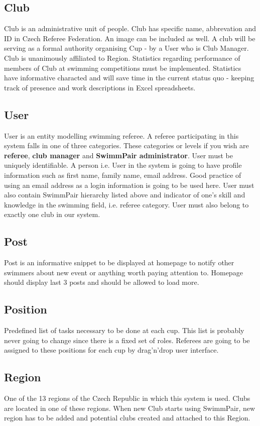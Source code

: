 \subsection*{Club}
\par
Club is an administrative unit of people. Club has specific name, abbrevation and ID in Czech Referee Federation. An image can be included as well. A club will be serving as a formal authority organising Cup - by a User who is Club Manager. Club is unanimously affiliated to Region. Statistics regarding performance of members of Club at swimming competitions must be implemented. Statistics have informative characted and will save time in the current status quo - keeping track of presence and work descriptions in Excel spreadsheets. 
\subsection*{User}
\par
User is an entity modelling swimming referee. A referee participating in this system falls in one of three categories. These categories or levels if you wish are \textbf{referee}, \textbf{club manager} and \textbf{SwimmPair administrator}. User must be uniquely identifiable. A person i.e. User in the system is going to have profile information such as first name, family name, email address. Good practice of using an email address as a login information is going to be used here. User must also contain SwimmPair hierarchy listed above and indicator of one's skill and knowledge in the swimming field, i.e. referee category. User must also belong to exactly one club in our system.
\subsection*{Post}
\par
Post is an informative snippet to be displayed at homepage to notify other swimmers about new event or anything worth paying attention to. Homepage should display last 3 posts and should be allowed to load more.
\subsection*{Position}
Predefined list of tasks necessary to be done at each cup. This list is probably never going to change since there is a fixed set of roles. Referees are going to be assigned to these positions for each cup by drag'n'drop user interface.
\subsection*{Region}
One of the 13 regions of the Czech Republic in which this system is used. Clubs are located in one of these regions. When new Club starts using SwimmPair, new region has to be added and potential clubs created and attached to this Region. 
\newpage
